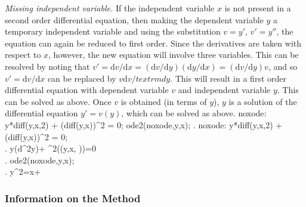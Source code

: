 \documentclass{article}
\begin{document}
\noindent
\textit{Missing independent variable.}\quad
If the independent variable $x$ is not present in a second order
differential equation, then making the dependent variable $y$ a
temporary independent variable and using the substitution $v=y'$,
$v'=y''$, the equation can again be reduced to first order.
Since the derivatives are taken with respect to $x$, however, 
the new equation will involve three variables.  This can be resolved
by noting that $v'=\textrm{d}v/\textrm{d}x =
(\textrm{d}v/\textrm{d}y)(\textrm{d}y/\textrm{d}x)  
= (\textrm{d}v/\textrm{d}y) v$, and so $v'= \textrm{d}v/\textrm{d}x$
can be replaced by $v\textrm{d}v/textrm{d}y$.  This will result in a
first order differential equation with dependent variable $v$ and
independent variable $y$.  This can be solved as above.
Once $v$ is obtained (in terms of $y$), $y$ is a solution of the
differential equation $y'=v(y)$, which can be solved as above.
\beginmaximasession
noxode: y*diff(y,x,2) + (diff(y,x))^2 = 0;
ode2(noxode,y,x);
\maximatexsession
{}.  noxode: y*diff(y,x,2) + (diff(y,x))^2 = 0; \\
.   y\*\left({{d^{2}}}\*y\right)+
 ^{2}\left(\left(y,\linebreak[0]x,
 \right)\right)=0 \\
.  ode2(noxode,y,x); \\
.   {{y^{2}}}=x+ \\
\endmaximasession

\subsubsection{Information on the Method}
\end{document}
